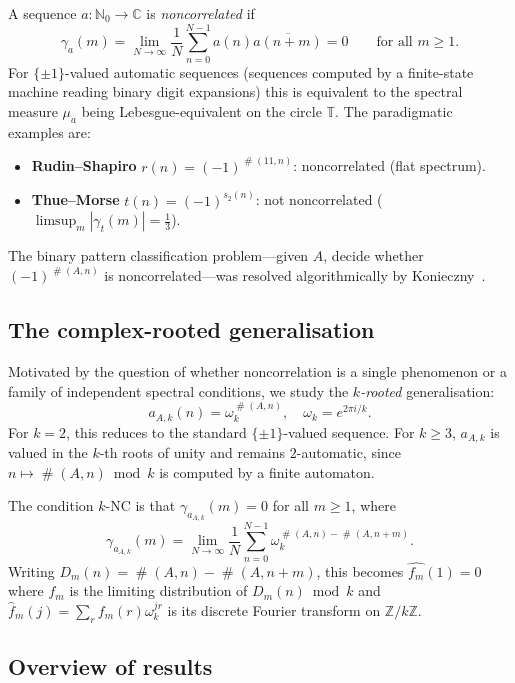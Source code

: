 \documentclass[11pt]{article}
\theoremstyle{definition}
\theoremstyle{remark}
\DeclareMathOperator{\occ}{\#}
\newcommand{\Z}{\mathbb{Z}}
\newcommand{\N}{\mathbb{N}}
\newcommand{\T}{\mathbb{T}}
\newcommand{\C}{\mathbb{C}}
\begin{document}
A sequence $a:\N_0 \to \C$ is \emph{noncorrelated} if
\[
  \gamma_a(m)
  = \lim_{N \to \infty} \frac{1}{N}\sum_{n=0}^{N-1} a(n)\overline{a(n+m)}
  = 0 \qquad \text{for all } m \geq 1.
\]
For $\{\pm1\}$-valued automatic sequences (sequences computed by a
finite-state machine reading binary digit expansions) this is equivalent
to the spectral measure $\mu_a$ being Lebesgue-equivalent on the circle
$\T$.  The paradigmatic examples are:
\begin{itemize}
  \item \textbf{Rudin--Shapiro} $r(n) = (-1)^{\occ(11, n)}$:
        noncorrelated (flat spectrum).
  \item \textbf{Thue--Morse} $t(n) = (-1)^{s_2(n)}$:
        not noncorrelated ($\limsup_m |\gamma_t(m)| = \tfrac13$).
\end{itemize}
The binary pattern classification problem---given $A$, decide whether
$(-1)^{\occ(A,n)}$ is noncorrelated---was resolved algorithmically by
Konieczny~\cite{Kon21}.

\subsection{The complex-rooted generalisation}

Motivated by the question of whether noncorrelation is a single
phenomenon or a family of independent spectral conditions, we study
the \emph{$k$-rooted} generalisation:
\[
  a_{A,k}(n) = \omega_k^{\occ(A,n)}, \quad \omega_k = e^{2\pi i/k}.
\]
For $k = 2$, this reduces to the standard $\{\pm1\}$-valued sequence.
For $k \geq 3$, $a_{A,k}$ is valued in the $k$-th roots of unity
and remains $2$-automatic, since $n \mapsto \occ(A,n) \bmod k$ is
computed by a finite automaton.

The condition $k$-NC is that $\gamma_{a_{A,k}}(m) = 0$ for all $m \geq 1$,
where
\[
  \gamma_{a_{A,k}}(m)
  = \lim_{N \to \infty} \frac{1}{N} \sum_{n=0}^{N-1}
    \omega_k^{\occ(A,n) - \occ(A,n+m)}.
\]
Writing $D_m(n) = \occ(A,n) - \occ(A,n+m)$, this becomes
$\widehat{f_m}(1) = 0$ where $f_m$ is the limiting distribution of
$D_m(n) \bmod k$ and $\hat{f}_m(j) = \sum_r f_m(r)\omega_k^{jr}$ is
its discrete Fourier transform on $\Z/k\Z$.

\subsection{Overview of results}
\end{document}
